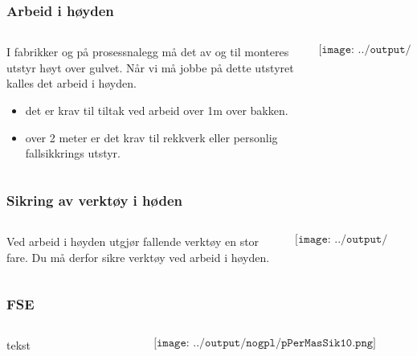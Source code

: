 \documentclass[aspectratio=169,xcolor=dvipsnames]{beamer}
\begin{document}
\begin{frame}
	\frametitle{Arbeid i høyden}
	\begin{columns}
		\begin{column}{0.5\textwidth}
I fabrikker og på prosessnalegg må det av og til monteres utstyr høyt over gulvet. Når vi må jobbe på dette utstyret kalles det arbeid i høyden. 			
\begin{itemize}
	\item det er krav til tiltak ved arbeid over 1m over bakken. 
	\item over 2 meter er det krav til rekkverk eller personlig fallsikkrings utstyr. 
\end{itemize}
		\end{column}

		\begin{column}{0.5\textwidth}
	$$\texttt{[image: ../output/nogpl/pPerMasSik08.png]}$$
		\end{column}
	\end{columns}
\end{frame}

\begin{frame}
	\frametitle{Sikring av verktøy i høden}
	\begin{columns}
		\begin{column}{0.5\textwidth}
Ved arbeid i høyden utgjør fallende verktøy en stor fare. Du må derfor sikre verktøy ved arbeid i høyden. 

			
		\end{column}

		\begin{column}{0.5\textwidth}
	$$\texttt{[image: ../output/nogpl/pPerMasSik09.png]}$$
		\end{column}
	\end{columns}
\end{frame}

\begin{frame}
	\frametitle{FSE}
	\begin{columns}
		\begin{column}{0.5\textwidth}
tekst
			
		\end{column}

		\begin{column}{0.5\textwidth}
	$$\texttt{[image: ../output/nogpl/pPerMasSik10.png]}$$
		\end{column}
	\end{columns}
\end{frame}
\end{document}
